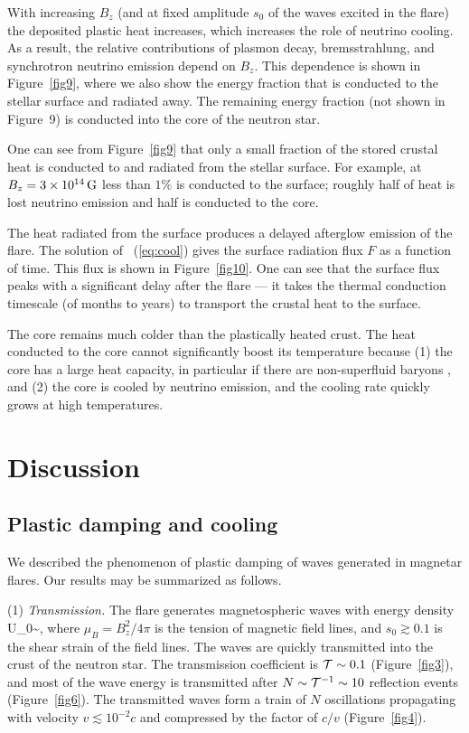 With increasing $B_z$ (and at fixed amplitude $s_0$ of the waves excited in the flare) the deposited plastic heat increases, which increases the role of neutrino cooling.
As a result, the relative contributions of plasmon decay, bremsstrahlung, and synchrotron neutrino emission depend on $B_z$. 
This dependence is shown in Figure~\ref{fig9}, where we also show the energy fraction that is conducted to the stellar surface and radiated away. 
The remaining energy fraction (not shown in Figure~9) is conducted into the core of the neutron star.

One can see from Figure~\ref{fig9} that only a small fraction of the stored crustal heat is conducted to and radiated from the stellar surface.
For example, at $B_z=3\times 10^{14}\,\rm G$ less than $1\%$ is conducted to the surface; roughly half of heat is lost neutrino emission and half is conducted to the core.

The heat radiated from the surface produces a delayed afterglow emission of the flare.
The solution of \Eq~(\ref{eq:cool}) gives the surface radiation flux $F$ as a function of time. 
This flux is shown in Figure~\ref{fig10}. 
One can see that the surface flux peaks with a significant delay after the flare --- it takes the thermal conduction timescale (of months to years) to transport the crustal heat to the surface.

The core remains much colder than the plastically heated crust. The heat conducted to the core cannot significantly boost its temperature because (1) the core has a large heat capacity, in particular if there are non-superfluid baryons \citep{2004ARA&A..42..169Y}, and (2) the core is cooled by neutrino emission, and the cooling rate quickly grows at high temperatures.

\section{Discussion}


\subsection{Plastic damping and cooling}

We described the phenomenon of plastic damping of \alfven waves 
generated in magnetar flares. Our results may be summarized as follows.

(1) {\it Transmission.}
The flare generates magnetospheric \alfven waves with energy density 
\beq
  U_0\sim {},
\eeq
where $\mu_B=B_z^2/4\pi$ is the tension of magnetic field lines, and $s_0\gtrsim 0.1$ is the shear strain of the field lines. The waves are quickly transmitted into the crust of the neutron star. 
The transmission coefficient is ${\mathcal T}\sim 0.1$ (Figure~\ref{fig3}), and most of the wave energy is transmitted after $N\sim {\mathcal T}^{-1} \sim 10$ reflection events (Figure~\ref{fig6}).
The transmitted waves form a train of $N$ oscillations propagating with velocity $v\lesssim 10^{-2}c$ and compressed by the factor of $c/v$ (Figure~\ref{fig4}).

